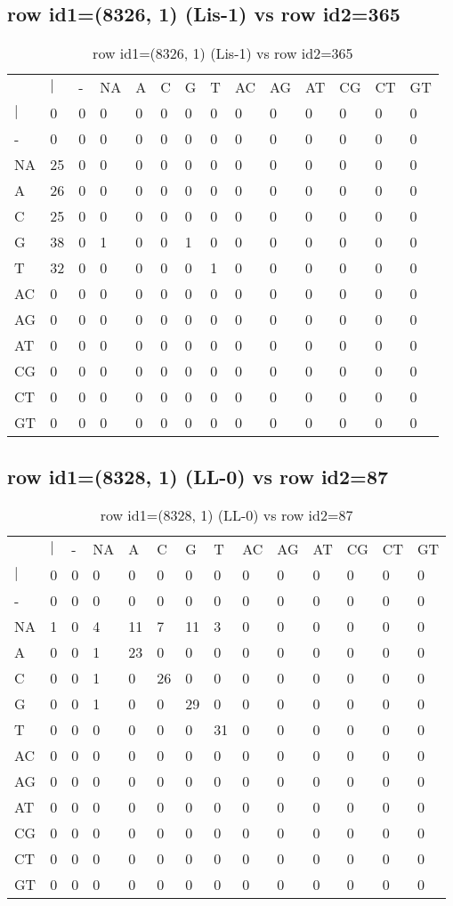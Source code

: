 \subsection{row id1=(8326, 1) (Lis-1) vs row id2=365}
\begin{center}
\begin{longtable}{|l|l|l|l|l|l|l|l|l|l|l|l|l|l|}
\caption{row id1=(8326, 1) (Lis-1) vs row id2=365} \label{table_dm524}\\
\hline
\\
\hline
&$|$&-&NA&A&C&G&T&AC&AG&AT&CG&CT&GT\\
$|$&0&0&0&0&0&0&0&0&0&0&0&0&0\\
-&0&0&0&0&0&0&0&0&0&0&0&0&0\\
NA&25&0&0&0&0&0&0&0&0&0&0&0&0\\
A&26&0&0&0&0&0&0&0&0&0&0&0&0\\
C&25&0&0&0&0&0&0&0&0&0&0&0&0\\
G&38&0&1&0&0&1&0&0&0&0&0&0&0\\
T&32&0&0&0&0&0&1&0&0&0&0&0&0\\
AC&0&0&0&0&0&0&0&0&0&0&0&0&0\\
AG&0&0&0&0&0&0&0&0&0&0&0&0&0\\
AT&0&0&0&0&0&0&0&0&0&0&0&0&0\\
CG&0&0&0&0&0&0&0&0&0&0&0&0&0\\
CT&0&0&0&0&0&0&0&0&0&0&0&0&0\\
GT&0&0&0&0&0&0&0&0&0&0&0&0&0\\
\hline
\end{longtable}
\end{center}

\subsection{row id1=(8328, 1) (LL-0) vs row id2=87}
\begin{center}
\begin{longtable}{|l|l|l|l|l|l|l|l|l|l|l|l|l|l|}
\caption{row id1=(8328, 1) (LL-0) vs row id2=87} \label{table_dm526}\\
\hline
\\
\hline
&$|$&-&NA&A&C&G&T&AC&AG&AT&CG&CT&GT\\
$|$&0&0&0&0&0&0&0&0&0&0&0&0&0\\
-&0&0&0&0&0&0&0&0&0&0&0&0&0\\
NA&1&0&4&11&7&11&3&0&0&0&0&0&0\\
A&0&0&1&23&0&0&0&0&0&0&0&0&0\\
C&0&0&1&0&26&0&0&0&0&0&0&0&0\\
G&0&0&1&0&0&29&0&0&0&0&0&0&0\\
T&0&0&0&0&0&0&31&0&0&0&0&0&0\\
AC&0&0&0&0&0&0&0&0&0&0&0&0&0\\
AG&0&0&0&0&0&0&0&0&0&0&0&0&0\\
AT&0&0&0&0&0&0&0&0&0&0&0&0&0\\
CG&0&0&0&0&0&0&0&0&0&0&0&0&0\\
CT&0&0&0&0&0&0&0&0&0&0&0&0&0\\
GT&0&0&0&0&0&0&0&0&0&0&0&0&0\\
\hline
\end{longtable}
\end{center}

